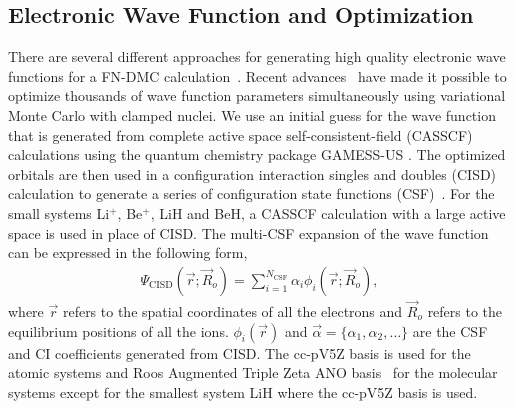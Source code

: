\documentclass[pra,superscriptaddress,groupedaddress,twocolumn]{revtex4}
\begin{document}
\subsection{Electronic Wave Function and Optimization}

There are several different approaches for generating high quality electronic wave functions for a FN-DMC calculation~\cite{Umrigar_Alleviation,Toulouse_Bench,Brown_Bench,Seth_Bench}. Recent advances~\cite{Nightingale_Linear,Umrigar_Linear,Brown_Bench} have made it possible to optimize thousands of wave function parameters simultaneously using variational Monte Carlo with clamped nuclei. We use an initial guess for the wave function that is generated from complete active space self-consistent-field (CASSCF) \cite{Chaban_MCSCF,Szabo} calculations using the quantum chemistry package GAMESS-US \cite{GAMESS}. The optimized orbitals are then used in a configuration interaction singles and doubles (CISD) calculation to generate a series of configuration state functions (CSF)~\cite{Pauncz_CSF}. For the small systems Li$^+$, Be$^+$, LiH and BeH, a CASSCF calculation with a large active space is used in place of CISD. The multi-CSF expansion of the wave function can be expressed in the following form,
\begin{align}
\Psi_{\text{CISD}}(\vec{r};\vec{R}_o)=\sum\limits_{i=1}^{N_{\text{CSF}}}\alpha_i\phi_i(\vec{r};\vec{R}_o), \label{eq:psi_gms}
\end{align}
where $\vec{r}$ refers to the spatial coordinates of all the electrons and $\vec{R}_o$ refers to the equilibrium positions of all the ions. $\phi_i(\vec{r})$ and $\vec{\alpha}=\{\alpha_1,\alpha_2,\dots\}$ are the CSF and CI coefficients generated from CISD. The cc-pV5Z basis \cite{dunning} is used for the atomic systems and Roos Augmented Triple Zeta ANO basis~\cite{roos} for the molecular systems except for the smallest system LiH where the cc-pV5Z basis is used.
\end{document}
